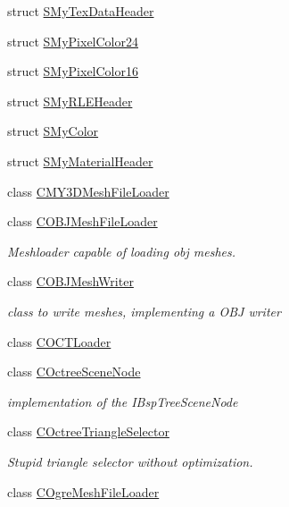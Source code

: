 \begin{DoxyCompactItemize}
\item 
struct \hyperlink{structirr_1_1scene_1_1_s_my_tex_data_header}{S\-My\-Tex\-Data\-Header}
\item 
struct \hyperlink{structirr_1_1scene_1_1_s_my_pixel_color24}{S\-My\-Pixel\-Color24}
\item 
struct \hyperlink{structirr_1_1scene_1_1_s_my_pixel_color16}{S\-My\-Pixel\-Color16}
\item 
struct \hyperlink{structirr_1_1scene_1_1_s_my_r_l_e_header}{S\-My\-R\-L\-E\-Header}
\item 
struct \hyperlink{structirr_1_1scene_1_1_s_my_color}{S\-My\-Color}
\item 
struct \hyperlink{structirr_1_1scene_1_1_s_my_material_header}{S\-My\-Material\-Header}
\item 
class \hyperlink{classirr_1_1scene_1_1_c_m_y3_d_mesh_file_loader}{C\-M\-Y3\-D\-Mesh\-File\-Loader}
\item 
class \hyperlink{classirr_1_1scene_1_1_c_o_b_j_mesh_file_loader}{C\-O\-B\-J\-Mesh\-File\-Loader}
\begin{DoxyCompactList}\small\item\em Meshloader capable of loading obj meshes. \end{DoxyCompactList}\item 
class \hyperlink{classirr_1_1scene_1_1_c_o_b_j_mesh_writer}{C\-O\-B\-J\-Mesh\-Writer}
\begin{DoxyCompactList}\small\item\em class to write meshes, implementing a O\-B\-J writer \end{DoxyCompactList}\item 
class \hyperlink{classirr_1_1scene_1_1_c_o_c_t_loader}{C\-O\-C\-T\-Loader}
\item 
class \hyperlink{classirr_1_1scene_1_1_c_octree_scene_node}{C\-Octree\-Scene\-Node}
\begin{DoxyCompactList}\small\item\em implementation of the I\-Bsp\-Tree\-Scene\-Node \end{DoxyCompactList}\item 
class \hyperlink{classirr_1_1scene_1_1_c_octree_triangle_selector}{C\-Octree\-Triangle\-Selector}
\begin{DoxyCompactList}\small\item\em Stupid triangle selector without optimization. \end{DoxyCompactList}\item 
class \hyperlink{classirr_1_1scene_1_1_c_ogre_mesh_file_loader}{C\-Ogre\-Mesh\-File\-Loader}

\end{DoxyCompactItemize}
